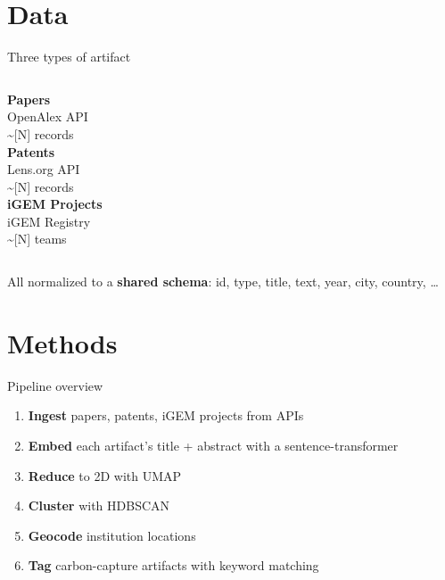 \documentclass[aspectratio=169, 12pt]{beamer}
\begin{document}
\section{Data}

\begin{frame}{Three types of artifact}
  \begin{columns}
    \textbf{\textcolor{synblue}{Papers}}\\
    OpenAlex API\\
    \textasciitilde{}[N] records\\
    [year range]

    \textbf{\textcolor{synorange}{Patents}}\\
    Lens.org API\\
    \textasciitilde{}[N] records\\
    [year range]

    \textbf{\textcolor{syngreen}{iGEM Projects}}\\
    iGEM Registry\\
    \textasciitilde{}[N] teams\\
    [year range]
  \end{columns}

  \vspace{2em}
  All normalized to a \textbf{shared schema}: id, type, title, text, year, city, country, \ldots
\end{frame}

\section{Methods}

\begin{frame}{Pipeline overview}
  \begin{enumerate}
    \item \textbf{Ingest} papers, patents, iGEM projects from APIs
    \item \textbf{Embed} each artifact's title + abstract with a sentence-transformer
    \item \textbf{Reduce} to 2D with UMAP
    \item \textbf{Cluster} with HDBSCAN
    \item \textbf{Geocode} institution locations
    \item \textbf{Tag} carbon-capture artifacts with keyword matching
  \end{enumerate}
\end{frame}
\end{document}
